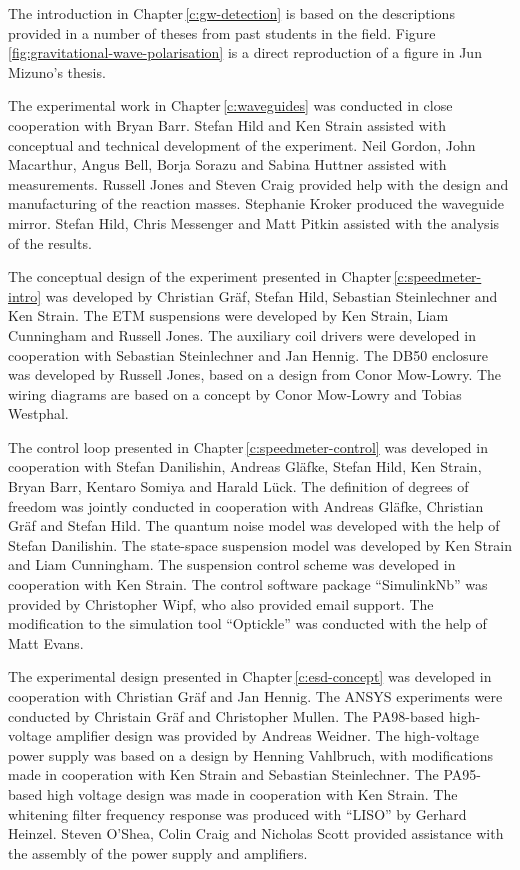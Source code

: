 The introduction in Chapter\,\ref{c:gw-detection} is based on the descriptions provided in a number of theses from past students in the field. Figure\,\ref{fig:gravitational-wave-polarisation} is a direct reproduction of a figure in Jun Mizuno's thesis.

The experimental work in Chapter\,\ref{c:waveguides} was conducted in close cooperation with Bryan Barr. Stefan Hild and Ken Strain assisted with conceptual and technical development of the experiment. Neil Gordon, John Macarthur, Angus Bell, Borja Sorazu and Sabina Huttner assisted with measurements. Russell Jones and Steven Craig provided help with the design and manufacturing of the reaction masses. Stephanie Kroker produced the waveguide mirror. Stefan Hild, Chris Messenger and Matt Pitkin assisted with the analysis of the results.

The conceptual design of the experiment presented in Chapter\,\ref{c:speedmeter-intro} was developed by Christian Gr\"{a}f, Stefan Hild, Sebastian Steinlechner and Ken Strain. The ETM suspensions were developed by Ken Strain, Liam Cunningham and Russell Jones. The auxiliary coil drivers were developed in cooperation with Sebastian Steinlechner and Jan Hennig. The DB50 enclosure was developed by Russell Jones, based on a design from Conor Mow-Lowry. The wiring diagrams are based on a concept by Conor Mow-Lowry and Tobias Westphal.

The control loop presented in Chapter\,\ref{c:speedmeter-control} was developed in cooperation with Stefan Danilishin, Andreas Gl\"{a}fke, Stefan Hild, Ken Strain, Bryan Barr, Kentaro Somiya and Harald L\"{u}ck. The definition of degrees of freedom was jointly conducted in cooperation with Andreas Gl\"{a}fke, Christian Gr\"{a}f and Stefan Hild. The quantum noise model was developed with the help of Stefan Danilishin. The state-space suspension model was developed by Ken Strain and Liam Cunningham. The suspension control scheme was developed in cooperation with Ken Strain. The control software package ``SimulinkNb'' was provided by Christopher Wipf, who also provided email support. The modification to the simulation tool ``Optickle'' was conducted with the help of Matt Evans.

The experimental design presented in Chapter\,\ref{c:esd-concept} was developed in cooperation with Christian Gr\"{a}f and Jan Hennig. The ANSYS experiments were conducted by Christain Gr\"{a}f and Christopher Mullen. The PA98-based high-voltage amplifier design was provided by Andreas Weidner. The high-voltage power supply was based on a design by Henning Vahlbruch, with modifications made in cooperation with Ken Strain and Sebastian Steinlechner. The PA95-based high voltage design was made in cooperation with Ken Strain. The whitening filter frequency response was produced with ``LISO'' by Gerhard Heinzel. Steven O'Shea, Colin Craig and Nicholas Scott provided assistance with the assembly of the power supply and amplifiers.

